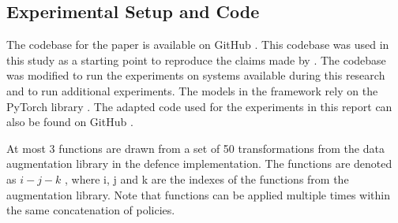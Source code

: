 




\subsection{Experimental Setup and Code}\label{sect:experiments}

The codebase for the paper is available on GitHub \cite{weigithub}. This codebase was used in this study as a starting point to reproduce the claims made by \citeauthor{gao2021privacy}. The codebase was modified to run the experiments on systems available during this research and to run additional experiments. The models in the framework rely on the PyTorch library \cite{NEURIPS2019_9015}. The adapted code used for the experiments in this report can also be found on GitHub \cite{reproduced}. %


At most 3 functions are drawn from a set of 50 transformations from the data augmentation library in the defence implementation. The functions are denoted as $i-j-k$ , where i, j and k are the indexes of the functions from the augmentation library. Note that functions can be applied multiple times within the same concatenation of policies.

